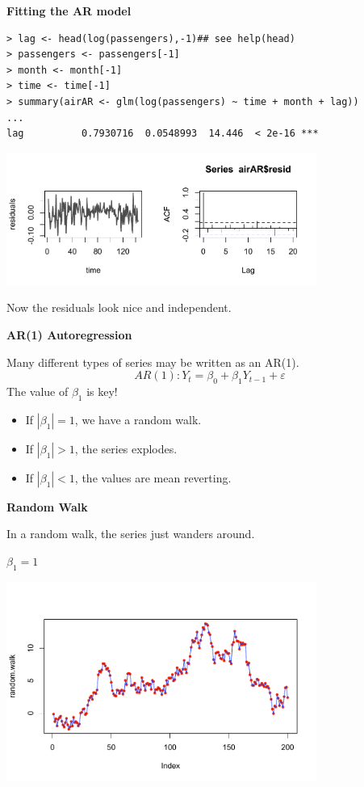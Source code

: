 \documentclass[12pt,xcolor=svgnames]{beamer}
\newcommand{\bk}{\color{black}}
\newcommand{\nv}{\color{Navy}}
\newcommand{\theme}{\color{Maroon}}
\newcommand{\sk}{\vspace{.5cm}}
\begin{document}
\begin{frame}[fragile]

{\bf \theme Fitting the AR model}

{\footnotesize\nv
\begin{verbatim}
> lag <- head(log(passengers),-1)## see help(head)
> passengers <- passengers[-1]
> month <- month[-1]
> time <- time[-1]
> summary(airAR <- glm(log(passengers) ~ time + month + lag))
...
lag          0.7930716  0.0548993  14.446  < 2e-16 ***
\end{verbatim}}

\includegraphics[width=4in]{../graphs/airlinear}

Now the residuals look nice and independent.

\end{frame}




\begin{frame}

{\bf AR(1) Autoregression}\sk

Many different types of series may be written as an AR(1).
\[
AR(1): Y_t = \beta_0 + \beta_1Y_{t-1} + \varepsilon
\]\nv
The value of $\beta_1$ is key! \bk
\begin{itemize}
\item  If $|\beta_1| = 1$, we have a random walk.
\item  If $|\beta_1| > 1$, the series explodes.
\item  If $|\beta_1| < 1$, the values are mean reverting.
\end{itemize}

\end{frame}


\begin{frame}

{\bf Random Walk}\sk

In a random walk, the series just wanders around.

\begin{center}
$\beta_1 = 1$
\end{center}
\vskip -1.5cm
\includegraphics[width=4in]{../graphs/randwalk}

\end{frame}
\end{document}
